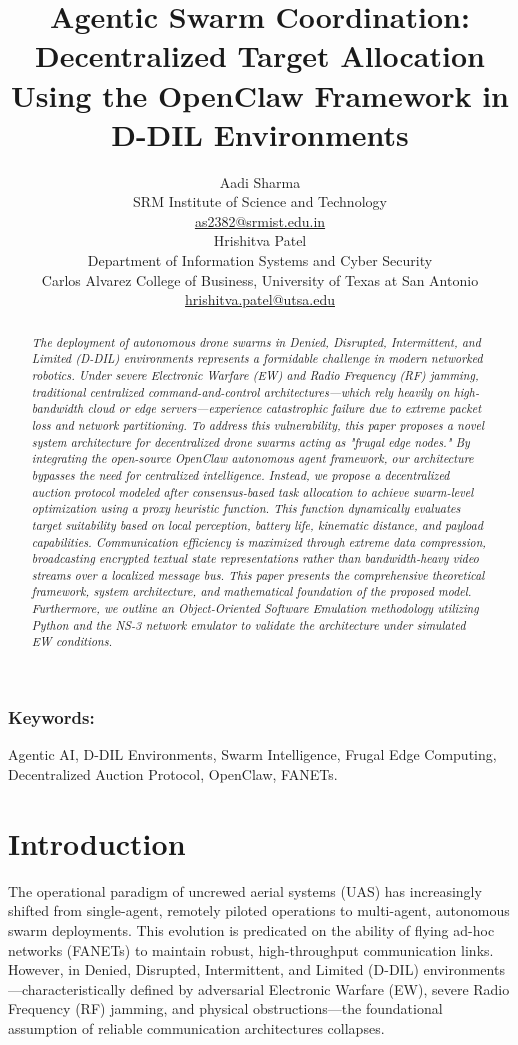 \documentclass[10pt]{article}
\title{Agentic Swarm Coordination: Decentralized Target Allocation Using the OpenClaw Framework in D-DIL Environments}
\author{Aadi Sharma \\
 SRM Institute of Science and Technology \\
 {\underline{ as2382@srmist.edu.in}} \\ \And
 Hrishitva Patel \\
 Department of Information Systems and Cyber Security \\
 Carlos Alvarez College of Business, University of Texas at San Antonio \\
 {\underline{ hrishitva.patel@utsa.edu} } \\ }
\date{}
\begin{document}
\maketitle

\begin{abstract}
\textit{The deployment of autonomous drone swarms in Denied, Disrupted, Intermittent, and Limited (D-DIL) environments represents a formidable challenge in modern networked robotics. Under severe Electronic Warfare (EW) and Radio Frequency (RF) jamming, traditional centralized command-and-control architectures—which rely heavily on high-bandwidth cloud or edge servers—experience catastrophic failure due to extreme packet loss and network partitioning. To address this vulnerability, this paper proposes a novel system architecture for decentralized drone swarms acting as "frugal edge nodes." By integrating the open-source OpenClaw autonomous agent framework, our architecture bypasses the need for centralized intelligence. Instead, we propose a decentralized auction protocol modeled after consensus-based task allocation to achieve swarm-level optimization using a proxy heuristic function. This function dynamically evaluates target suitability based on local perception, battery life, kinematic distance, and payload capabilities. Communication efficiency is maximized through extreme data compression, broadcasting encrypted textual state representations rather than bandwidth-heavy video streams over a localized message bus. This paper presents the comprehensive theoretical framework, system architecture, and mathematical foundation of the proposed model. Furthermore, we outline an Object-Oriented Software Emulation methodology utilizing Python and the NS-3 network emulator to validate the architecture under simulated EW conditions.}
\end{abstract}

\subsubsection*{Keywords:}
Agentic AI, D-DIL Environments, Swarm Intelligence, Frugal Edge Computing, Decentralized Auction Protocol, OpenClaw, FANETs.

\section{Introduction}

The operational paradigm of uncrewed aerial systems (UAS) has increasingly shifted from single-agent, remotely piloted operations to multi-agent, autonomous swarm deployments. This evolution is predicated on the ability of flying ad-hoc networks (FANETs) to maintain robust, high-throughput communication links. However, in Denied, Disrupted, Intermittent, and Limited (D-DIL) environments—characteristically defined by adversarial Electronic Warfare (EW), severe Radio Frequency (RF) jamming, and physical obstructions—the foundational assumption of reliable communication architectures collapses.
\end{document}
